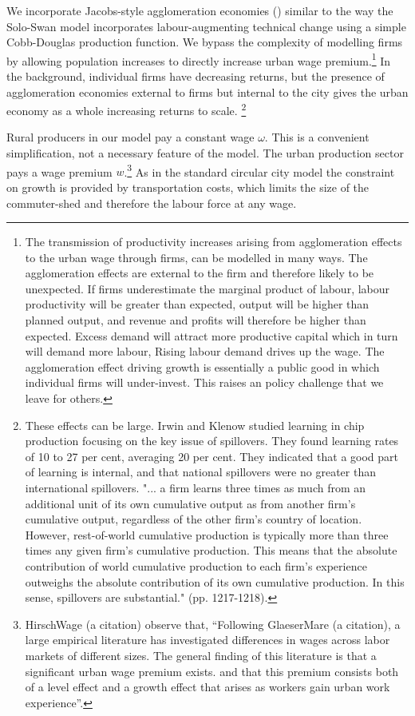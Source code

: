 We  incorporate Jacobs-style agglomeration economies (\cite{Beaudry:2009ua, Panne:2004vb, JacobsEofC})  similar to the way the  Solo-Swan model incorporates  labour-augmenting technical change using a simple Cobb-Douglas production function.  We bypass the complexity of modelling firms  by allowing population increases  to directly increase urban wage premium.\footnote{The transmission of productivity increases arising from agglomeration effects  to the urban wage through firms, can be modelled in many ways. The agglomeration effects are external to the firm and therefore likely to be unexpected. If  firms underestimate the marginal product of labour, labour productivity will be greater than expected, output will be higher than planned output, and revenue and profits will therefore be higher than expected. Excess demand will attract more productive capital which in turn will demand more labour,  Rising labour demand drives up the wage. The agglomeration effect driving growth is essentially a public good in which individual firms will under-invest. This raises an policy challenge that we leave for others.} %
In the background, individual firms have decreasing returns, but the presence of agglomeration economies external to firms but internal to the city gives the urban economy as a whole increasing returns to scale. \footnote{These effects can be large. Irwin and Klenow  studied learning in chip production focusing  on the key issue of spillovers. They found learning rates of 10 to 27 per cent, averaging 20 per cent. They indicated that a good part of learning is internal, and that national spillovers were no greater than international spillovers. "... a firm learns three times as much from an additional unit of its own cumulative output as from another firm's cumulative output, regardless of the other firm's country of location. However, rest-of-world cumulative production is typically more than three times any given firm's cumulative production. This means that the absolute contribution of world cumulative production to each firm's experience outweighs the absolute contribution of its own cumulative production. In this sense, spillovers are substantial." (pp. 1217-1218).} 


Rural producers in our model pay a constant wage $\omega$. This is a convenient simplification, not a necessary feature of the model. The urban production sector pays a wage premium $w$.\footnote{
HirschWage (a citation) observe that, ``Following GlaeserMare (a citation),  a  large  empirical  literature  has  investigated differences in wages across labor markets of different sizes. The general finding of this literature is that a significant urban wage premium exists. and that this premium consists both of a level effect and a growth effect that arises as workers gain urban work experience''. } As in the standard circular city model the constraint on growth is provided by transportation costs, which limits the size of the commuter-shed and therefore the labour force at any wage. 






